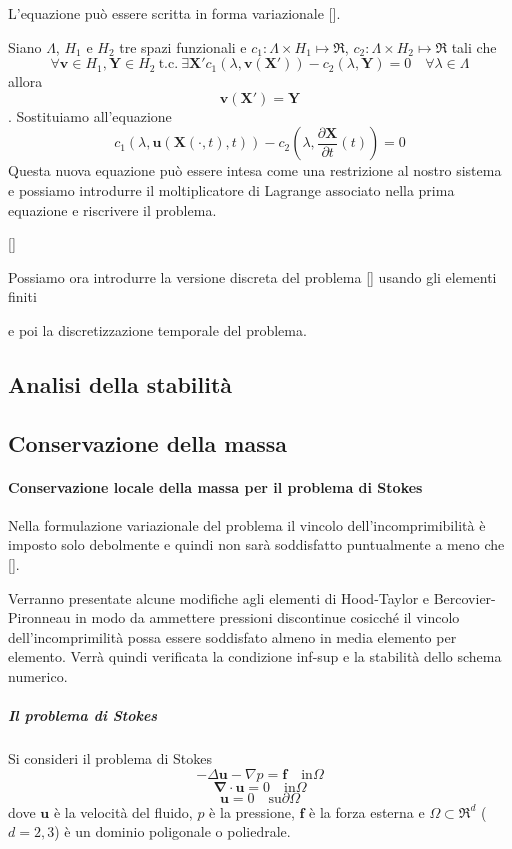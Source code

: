 \documentclass{book}
\newcommand{\Nabla}{\boldsymbol{\nabla}}
\newcommand{\tc}{\ \text{t.c.}\ }
\begin{document}
L'equazione può essere scritta in forma variazionale [].

Siano $\Lambda$, $H_1$ e $H_2$ tre spazi funzionali e $c_1:\Lambda\times H_1\mapsto\Re$, $c_2:\Lambda\times H_2\mapsto\Re$ tali che
$$\forall\mathbf{v}\in H_1,\mathbf{Y}\in H_2\tc\exists\mathbf{X'} c_1(\lambda,\mathbf{v}(\mathbf{X'}))-c_2(\lambda,\mathbf{Y})=0 \quad\forall\lambda\in\Lambda$$
allora $$\mathbf{v}(\mathbf{X'})=\mathbf{Y}$$.
Sostituiamo all'equazione
$$c_1(\lambda,\mathbf{u}(\mathbf{X}(\cdot,t),t))-c_2(\lambda,\frac{\partial\mathbf{X}}{\partial t}(t))=0$$
Questa nuova equazione può essere intesa come una restrizione al nostro sistema e possiamo introdurre il moltiplicatore di Lagrange associato nella prima equazione e riscrivere il problema.

[]

Possiamo ora introdurre la versione discreta del problema [] usando gli elementi finiti

e poi la discretizzazione temporale del problema.

\subsection{Analisi della stabilità }


\subsection{Conservazione della massa}

\paragraph{Conservazione locale della massa per il problema di Stokes}
Nella formulazione variazionale del problema il vincolo dell'incomprimibilità è imposto solo debolmente e quindi non sarà soddisfatto puntualmente a meno che [].

Verranno presentate alcune modifiche agli elementi di Hood-Taylor e Bercovier-Pironneau in modo da ammettere pressioni discontinue cosicché il vincolo dell'incomprimilità possa essere soddisfato almeno in media elemento per elemento. Verrà quindi verificata la condizione inf-sup e la stabilità dello schema numerico.

\subparagraph{Il problema di Stokes}
Si consideri il problema di Stokes
$$-\Delta\mathbf{u}-\nabla p=\mathbf{f}\quad\text{in}\Omega$$
$$\Nabla\cdot\mathbf{u}=0\quad\text{in}\Omega$$
$$\mathbf{u}=0\quad\text{su}\partial\Omega$$
dove $\mathbf{u}$ è la velocità del fluido, $p$ è la pressione, $\mathbf{f}$ è la forza esterna e $\Omega\subset\Re^d$ ($d=2,3$) è un dominio poligonale o poliedrale.
\end{document}
